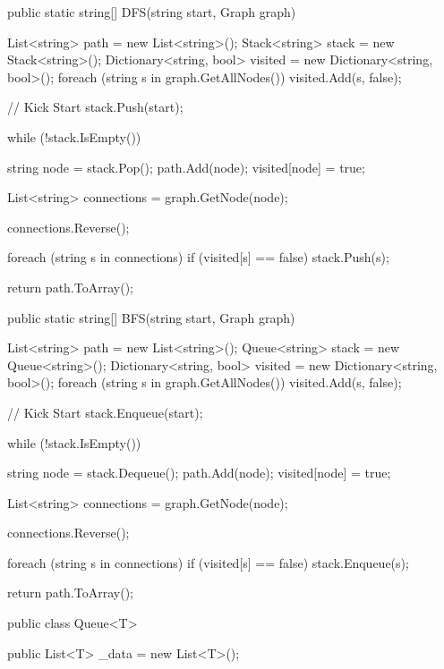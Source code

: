 \begin{flushleft}
\begin{cscode}
{{        public static string[] DFS(string start, Graph graph)
        {
            List<string> path = new List<string>();
            Stack<string> stack = new Stack<string>();
            Dictionary<string, bool> visited = new Dictionary<string, bool>();
            foreach (string s in graph.GetAllNodes()) visited.Add(s, false);

            // Kick Start
            stack.Push(start);

            while (!stack.IsEmpty())
            {

                string node = stack.Pop();
                path.Add(node);
                visited[node] = true;

                List<string> connections = graph.GetNode(node);

                connections.Reverse();

                foreach (string s in connections)
                {
                    if (visited[s] == false)
                    {
                        stack.Push(s);
                    }
                }
            }


            return path.ToArray();
        }

        public static string[] BFS(string start, Graph graph)
        {
            List<string> path = new List<string>();
            Queue<string> stack = new Queue<string>();
            Dictionary<string, bool> visited = new Dictionary<string, bool>();
            foreach (string s in graph.GetAllNodes()) visited.Add(s, false);

            // Kick Start
            stack.Enqueue(start);

            while (!stack.IsEmpty())
            {

                string node = stack.Dequeue();
                path.Add(node);
                visited[node] = true;

                List<string> connections = graph.GetNode(node);

                connections.Reverse();

                foreach (string s in connections)
                {
                    if (visited[s] == false)
                    {
                        stack.Enqueue(s);
                    }
                }
            }

            return path.ToArray();
        }
    }

    public class Queue<T>
    {
        public List<T> _data = new List<T>();

}}
\end{cscode}
\end{flushleft}
